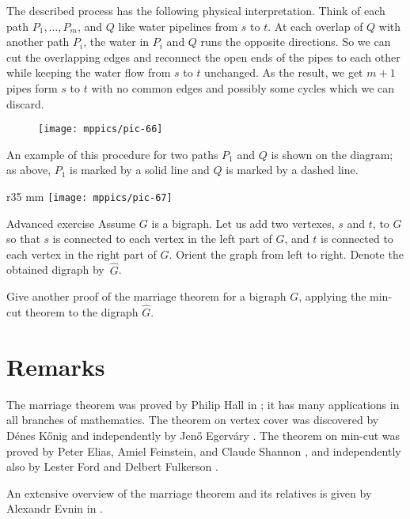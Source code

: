 The described process has the following physical interpretation.
Think of each path $P_1,\dots,P_m$, and $Q$ like water pipelines from $s$ to $t$.
At each overlap of $Q$ with another path $P_i$, the water in $P_i$ and $Q$ runs the opposite directions.
So we can cut the overlapping edges and reconnect the open ends of the pipes to each other while keeping the water flow from $s$ to $t$ unchanged.
As the result, we get $m+1$ pipes form $s$ to $t$ with no common edges and possibly some cycles which we can discard.
\begin{figure}[h!]%
\vskip-0mm
\centering
\texttt{[image: mppics/pic-66]}
\vskip0mm
\end{figure}
An example of this procedure for two paths $P_1$ and $Q$ is shown on the diagram;
as above, $P_1$ is marked by a solid line and $Q$ is marked by a dashed line.

\begin{wrapfigure}{r}{35 mm}
\vskip-8mm
\centering
\texttt{[image: mppics/pic-67]}
\end{wrapfigure}

\begin{thm}{Advanced exercise}
Assume $G$ is a bigraph.
Let us add two vertexes, $s$ and $t$, to $G$ so that $s$ is connected to each vertex in the left part of $G$, and $t$ is connected to each vertex in the right part of $G$.
Orient the graph from left to right.
Denote the obtained digraph by~$\hat G$.

Give another proof of the marriage theorem for a bigraph $G$, applying the min-cut theorem to the digraph $\hat G$. 
\end{thm}


\section*{Remarks}

The marriage theorem was proved by Philip Hall in \cite{hall};
it has many applications in all branches of mathematics.
The theorem on vertex cover was discovered by D\'enes K\H{o}nig \cite{konig} and independently by Jen\H{o} Egerv\'ary \cite{egervary}.
The theorem on min-cut was proved by Peter Elias, Amiel Feinstein, and Claude Shannon \cite{EFS}, 
and independently also by Lester Ford and Delbert Fulkerson \cite{ford-fulkerson}.

An extensive overview of the marriage theorem and its relatives is given by Alexandr Evnin in \cite{evnin}.

